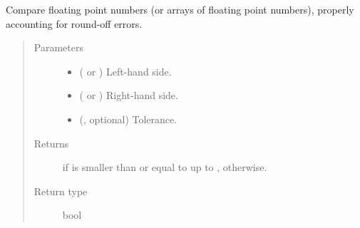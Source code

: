 \documentclass[letterpaper,10pt,english]{sphinxmanual}
\begin{document}

\begin{fulllineitems}
\label{\detokenize{api:utils.utils.smaller_or_equal_than}}
Compare floating point numbers (or arrays of floating point numbers), properly accounting for round-off errors.
\begin{quote}\begin{description}
\item[{Parameters}] \leavevmode\begin{itemize}
\item {} 
 ( or ) \textendash{} Left-hand side.

\item {} 
 ( or ) \textendash{} Right-hand side.

\item {} 
 (, optional) \textendash{} Tolerance.

\end{itemize}

\item[{Returns}] \leavevmode
{} if  is smaller than or equal to  up to ,  otherwise.

\item[{Return type}] \leavevmode
bool

\end{description}\end{quote}

\end{fulllineitems}

\end{document}
